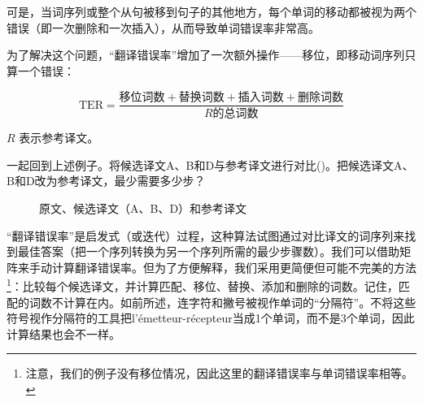\documentclass[output=paper]{langscibook}
\begin{document}
可是，当词序列或整个从句被移到句子的其他地方，每个单词的移动都被视为两个错误（即一次删除和一次插入），从而导致单词错误率非常高。

为了解决这个问题，“翻译错误率”增加了一次额外操作——移位，即移动词序列只算一个错误：

\begin{equation}
\text{TER}=\frac{\text{移位词数}+\text{替换词数}+\text{插入词数}+\text{删除词数}}{R \text{的总词数}}
\end{equation}

\noindent $R$ 表示参考译文。


一起回到上述例子。将候选译文A、B和D与参考译文进行对比()。把候选译文A、B和D改为参考译文，最少需要多少步？

\begin{figure}
\small
{}
\caption{原文、候选译文（A、B、D）和参考译文}
\label{fig:rossi:7b}
\end{figure}

“翻译错误率”是启发式（或迭代）过程，这种算法试图通过对比译文的词序列来找到最佳答案（把一个序列转换为另一个序列所需的最少步骤数）。我们可以借助矩阵来手动计算翻译错误率。但为了方便解释，我们采用更简便但可能不完美的方法\footnote{注意，我们的例子没有移位情况，因此这里的翻译错误率与单词错误率相等。}：比较每个候选译文，并计算匹配、移位、替换、添加和删除的词数。记住，匹配的词数不计算在内。如前所述，连字符和撇号被视作单词的“分隔符”。不将这些符号视作分隔符的工具把l’émetteur-récepteur当成1个单词，而不是3个单词，因此计算结果也会不一样。



\begin{table}[H]
\caption{候选译文A变成参考译文所需的操作步骤\label{tab:rossi:5}}
\end{table}
\end{document}
